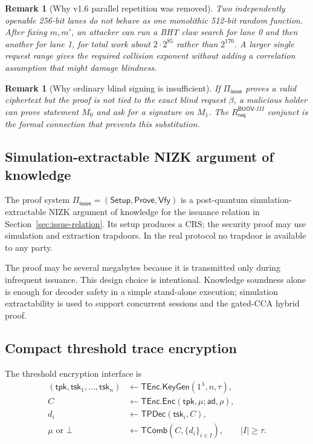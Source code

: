 \documentclass[11pt]{article}
\newtheorem{remark}[definition]{Remark}
\newcommand{\BUOV}{\mathsf{BUOV}}
\newcommand{\Piiss}{\Pi_{\mathsf{issue}}}
\newcommand{\TEnc}{\mathsf{TEnc}}
\newcommand{\TPDec}{\mathsf{TPDec}}
\newcommand{\TComb}{\mathsf{TComb}}
\begin{document}
\begin{remark}[Why v1.6 parallel repetition was removed]
Two independently openable 256-bit lanes do not behave as one monolithic
512-bit random function.  After fixing $m,m'$, an attacker can run a BHT claw
search for lane 0 and then another for lane 1, for total work about
$2\cdot2^{85}$ rather than $2^{170}$.  A larger single request range gives the
required collision exponent without adding a correlation assumption that might
damage blindness.
\end{remark}

\begin{remark}[Why ordinary blind signing is insufficient]
If $\Piiss$ proves a valid ciphertext but the proof is not tied to the exact
blind request $\beta$, a malicious holder can prove statement $M_0$ and ask for
a signature on $M_1$.  The
$R^{\BUOV\text{-}III}_{\mathsf{req}}$ conjunct is the formal
connection that prevents this substitution.
\end{remark}

\subsection{Simulation-extractable NIZK argument of knowledge}

The proof system $\Piiss=(\mathsf{Setup},\mathsf{Prove},\mathsf{Vfy})$ is a
post-quantum simulation-extractable NIZK argument of knowledge for the issuance
relation in Section~\ref{sec:issue-relation}.  Its setup produces a CRS; the
security proof may use simulation and extraction trapdoors.  In the real
protocol no trapdoor is available to any party.

The proof may be several megabytes because it is transmitted only during
infrequent issuance.  This design choice is intentional.  Knowledge
soundness alone is enough for decoder safety in a simple stand-alone execution;
simulation extractability is used to support concurrent sessions and the
gated-CCA hybrid proof.

\subsection{Compact threshold trace encryption}

The threshold encryption interface is
\begin{align*}
  (\mathsf{tpk},\mathsf{tsk}_1,\ldots,\mathsf{tsk}_n)
    &\leftarrow \TEnc.\mathsf{KeyGen}(1^\lambda,n,\tau),\\
  C&\leftarrow \TEnc.\mathsf{Enc}(\mathsf{tpk},\mu;\mathsf{ad},\rho),\\
  d_i&\leftarrow \TPDec(\mathsf{tsk}_i,C),\\
  \mu\text{ or }\bot&\leftarrow \TComb(C,\{d_i\}_{i\in I}),\qquad |I|\geq\tau.
\end{align*}
\end{document}
